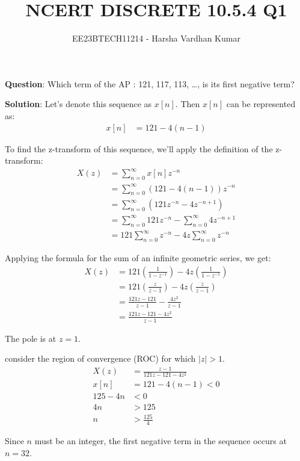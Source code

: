 \documentclass[journal,12pt,twocolumn]{IEEEtran}
\title{NCERT DISCRETE 10.5.4 Q1}
\author{EE23BTECH11214 - Harsha Vardhan Kumar}
\begin{document}
\maketitle

\noindent \textbf{Question}:
Which term of the AP : 121, 117, 113, \ldots, is its first negative term?

\textbf{Solution}:
Let's denote this sequence as \( x[n] \). Then \( x[n] \) can be represented as:
\begin{align}
x[n] &= 121 - 4(n-1)   
\end{align}

To find the z-transform of this sequence, we'll apply the definition of the z-transform:
\begin{align}
X(z) &= \sum_{n=0}^{\infty} x[n]z^{-n} \\
&= \sum_{n=0}^{\infty} (121 - 4(n-1))z^{-n} \\
&= \sum_{n=0}^{\infty} (121z^{-n} - 4z^{-n+1}) \\
&= \sum_{n=0}^{\infty} 121z^{-n} - \sum_{n=0}^{\infty} 4z^{-n+1} \\
&= 121\sum_{n=0}^{\infty} z^{-n} - 4z\sum_{n=0}^{\infty} z^{-n} 
\end{align}

Applying the formula for the sum of an infinite geometric series, we get:
\begin{align}
X(z) &= 121\left(\frac{1}{1 - z^{-1}}\right) - 4z\left(\frac{1}{1 - z^{-1}}\right) \\
&= 121\left(\frac{z}{z - 1}\right) - 4z\left(\frac{z}{z - 1}\right) \\
&= \frac{121z - 121}{z - 1} - \frac{4z^2}{z - 1} \\
&= \frac{121z - 121 - 4z^2}{z - 1} 
\end{align}

The pole is at \( z = 1 \).

consider the region of convergence (ROC) for which \( |z| > 1 \).
\begin{align}
X(z) &= \frac{z-1}{121z-121-4z^2} \\
x[n] &= 121 - 4(n-1) < 0 \\
125 - 4n &< 0 \\
4n &> 125 \\
n &> \frac{125}{4} 
\end{align}

Since \( n \) must be an integer, the first negative term in the sequence occurs at \( n = 32 \).
\end{document}
